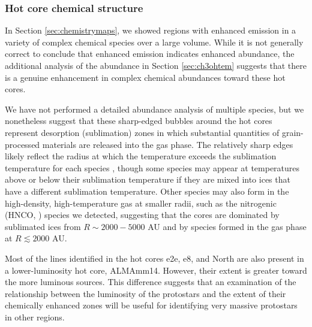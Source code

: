 \documentclass{emulateapj}
\begin{document}
\subsubsection{Hot core chemical structure}
\label{sec:cheminterp}
In Section \ref{sec:chemistrymaps}, we showed regions with enhanced emission
in a variety of complex chemical species over a large volume.  While it is
not generally correct to conclude that enhanced emission indicates enhanced
abundance, the additional analysis of the \methanol abundance 
in Section \ref{sec:ch3ohtem} suggests that there is a genuine enhancement in
complex chemical abundances toward these hot cores.



We have not performed a detailed abundance analysis of multiple species, but we
nonetheless suggest that these sharp-edged bubbles around the hot cores
represent desorption (sublimation) zones in which substantial quantities of
grain-processed materials are released into the gas phase.  The relatively
sharp edges likely reflect the radius at which the temperature exceeds
the sublimation temperature for each species \citep{Garrod2006a,Green2009a},
though some species may appear at temperatures above or below their sublimation
temperature if they are mixed into ices that have a different sublimation
temperature.  Other species may also form in the high-density, high-temperature
gas at smaller radii, such as the nitrogenic (HNCO, \formamide) species we
detected, suggesting that the cores are dominated by sublimated ices from
$R\sim2000-5000$ AU and by species formed in the gas phase at $R\lesssim2000$
AU.

Most of the lines identified in the hot cores e2e, e8, and North are also
present in a lower-luminosity hot core, ALMAmm14.  However, their extent is
greater toward the more luminous sources.  This difference suggests that an
examination of the relationship between the luminosity of the protostars and
the extent of their chemically enhanced zones will be useful for identifying
 very massive protostars in other regions.
\end{document}

